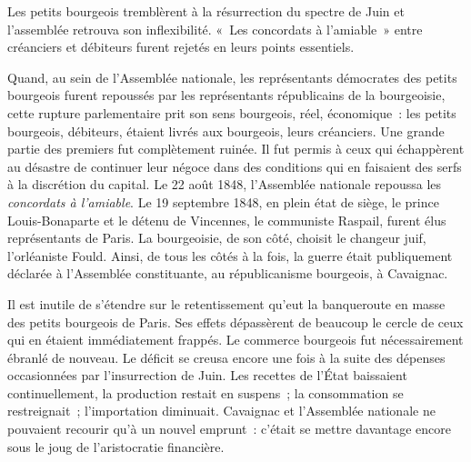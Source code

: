 \documentclass[french,twoside]{book} %
\begin{document}
Les petits bourgeois tremblèrent à la résurrection du spectre de Juin et l’assemblée retrouva son inflexibilité. « Les concordats à l’amiable » entre créanciers et débiteurs furent rejetés en leurs points essentiels.\par
Quand, au sein de l’Assemblée nationale, les représentants démocrates des petits bourgeois furent repoussés par les représentants républicains de la bourgeoisie, cette rupture parlementaire prit son sens bourgeois, réel, économique : les petits bourgeois, débiteurs, étaient livrés aux bourgeois, leurs créanciers. Une grande partie des premiers fut complètement ruinée. Il fut permis à ceux qui échappèrent au désastre de continuer leur négoce dans des conditions qui en faisaient des serfs à la discrétion du capital. Le 22 août 1848, l’Assemblée nationale repoussa les \emph{concordats à l’amiable}. Le 19 septembre 1848, en plein état de siège, le prince Louis-Bonaparte et le détenu de Vincennes, le communiste Raspail, furent élus représentants de Paris. La bourgeoisie, de son côté, choisit le changeur juif, l’orléaniste Fould. Ainsi, de tous les côtés à la fois, la guerre était publiquement déclarée à l’Assemblée constituante, au républicanisme bourgeois, à Cavaignac.\par
Il est inutile de s’étendre sur le retentissement qu’eut la banqueroute en masse des petits bourgeois de Paris. Ses effets dépassèrent de beaucoup le cercle de ceux qui en étaient immédiatement frappés. Le commerce bourgeois fut nécessairement ébranlé de nouveau. Le déficit se creusa encore une fois à la suite des dépenses occasionnées par l’insurrection de Juin. Les recettes de l’État baissaient continuellement, la production restait en suspens ; la consommation se restreignait ; l’importation diminuait. Cavaignac et l’Assemblée nationale ne pouvaient recourir qu’à un nouvel emprunt : c’était se mettre davantage encore sous le joug de l’aristocratie financière.\par
\end{document}
